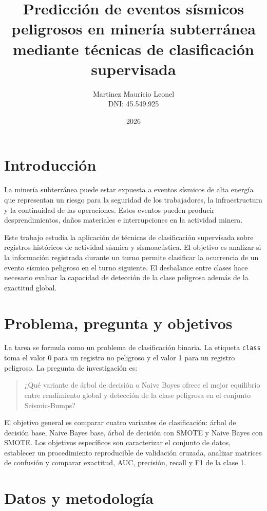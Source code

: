 \documentclass[12pt,a4paper]{article}
\title{Predicción de eventos sísmicos peligrosos en minería subterránea mediante técnicas de clasificación supervisada}
\author{Martinez Mauricio Leonel\\DNI: 45.549.925}
\date{2026}
\begin{document}
\maketitle

\section{Introducción}

La minería subterránea puede estar expuesta a eventos sísmicos de alta energía que representan un riesgo para la seguridad de los trabajadores, la infraestructura y la continuidad de las operaciones. Estos eventos pueden producir desprendimientos, daños materiales e interrupciones en la actividad minera.

Este trabajo estudia la aplicación de técnicas de clasificación supervisada sobre registros históricos de actividad sísmica y sismoacústica. El objetivo es analizar si la información registrada durante un turno permite clasificar la ocurrencia de un evento sísmico peligroso en el turno siguiente. El desbalance entre clases hace necesario evaluar la capacidad de detección de la clase peligrosa además de la exactitud global.

\section{Problema, pregunta y objetivos}

La tarea se formula como un problema de clasificación binaria. La etiqueta \texttt{class} toma el valor 0 para un registro no peligroso y el valor 1 para un registro peligroso. La pregunta de investigación es:

\begin{quote}
¿Qué variante de árbol de decisión o Naive Bayes ofrece el mejor equilibrio entre rendimiento global y detección de la clase peligrosa en el conjunto Seismic-Bumps?
\end{quote}

El objetivo general es comparar cuatro variantes de clasificación: árbol de decisión base, Naive Bayes base, árbol de decisión con SMOTE y Naive Bayes con SMOTE. Los objetivos específicos son caracterizar el conjunto de datos, establecer un procedimiento reproducible de validación cruzada, analizar matrices de confusión y comparar exactitud, AUC, precisión, recall y F1 de la clase 1.

\section{Datos y metodología}
\end{document}
